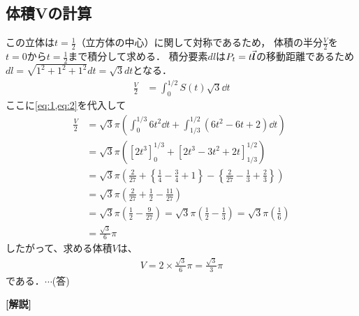 \documentclass[a4paper,10pt]{ltjsarticle}
\begin{document}
\begin{multicols}{2}
\subsection{体積Vの計算}
この立体は$t=\frac{1}{2}$（立方体の中心）に関して対称であるため，
体積の半分$\frac{V}{2}$を$t=0$から$t=\frac{1}{2}$まで積分して求める．
積分要素$dl$は$P_t = t\va*{l}$の移動距離であるため$dl = \sqrt{1^2+1^2+1^2}dt = \sqrt{3}dt$となる．
\begin{align*}
   \frac{V}{2} 
   &= \int_{0}^{1/2} S(t) \sqrt{3} \dd t 
\end{align*}
ここに\cref{eq:1,eq:2}を代入して
\begin{align*}
\frac{V}{2} 
&= \sqrt{3}\pi \left( \int_{0}^{1/3} 6t^2 \dd t + \int_{1/3}^{1/2} (6t^2 - 6t + 2) \dd t \right) \\
&= \sqrt{3}\pi \left( \left[ 2t^3 \right]_{0}^{1/3} + \left[ 2t^3 - 3t^2 + 2t \right]_{1/3}^{1/2} \right) \\
&= \sqrt{3}\pi \left( \frac{2}{27} + \left\{ \frac{1}{4} - \frac{3}{4} + 1 \right\} - \left\{ \frac{2}{27} - \frac{1}{3} + \frac{2}{3} \right\} \right) \\
&= \sqrt{3}\pi \left( \frac{2}{27} + \frac{1}{2} - \frac{11}{27} \right) \\
&= \sqrt{3}\pi \left( \frac{1}{2} - \frac{9}{27} \right) = \sqrt{3}\pi \left( \frac{1}{2} - \frac{1}{3} \right) = \sqrt{3}\pi \left( \frac{1}{6} \right) \\
&= \frac{\sqrt{3}}{6}\pi
\end{align*}
したがって、求める体積$V$は、
\begin{align*}
V = 2 \times \frac{\sqrt{3}}{6}\pi = \frac{\sqrt{3}}{3}\pi 
\end{align*}
である．$\cdots$(答)


{\bf[解説]}

     \newpage
\end{multicols}
\end{document}
